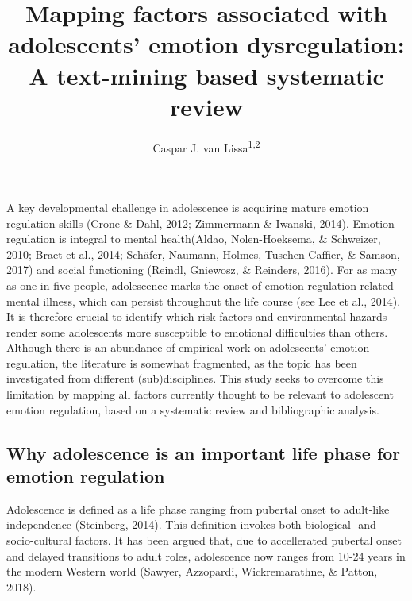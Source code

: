 \documentclass[
  english,
  man]{apa6}
\author{Caspar J. van Lissa\textsuperscript{1,2}}
\affiliation{
\vspace{0.5cm}
\textsuperscript{1} Utrecht University faculty of Social and Behavioral Sciences, department of Methodology \& Statistics\\\textsuperscript{2} Open Science Community Utrecht}
\title{Mapping factors associated with adolescents' emotion dysregulation: A text-mining based systematic review}
\date{}
\begin{document}
\maketitle

A key developmental challenge in adolescence is acquiring mature emotion
regulation skills (Crone \& Dahl, 2012; Zimmermann \& Iwanski, 2014). Emotion regulation is integral to
mental health(Aldao, Nolen-Hoeksema, \& Schweizer, 2010; Braet et al., 2014; Schäfer, Naumann, Holmes, Tuschen-Caffier, \& Samson, 2017)
and social functioning (Reindl, Gniewosz, \& Reinders, 2016). For as many
as one in five people, adolescence marks the onset of emotion
regulation-related mental illness, which can persist throughout the life course
(see Lee et al., 2014). It is therefore crucial to identify which
risk factors and environmental hazards render some adolescents more susceptible
to emotional difficulties than others. Although there is an abundance of
empirical work on adolescents' emotion regulation, the literature is somewhat
fragmented, as the topic has been investigated from different (sub)disciplines.
This study seeks to overcome this limitation by mapping all factors currently
thought to be relevant to adolescent emotion regulation, based on a systematic
review and bibliographic analysis.

\hypertarget{why-adolescence-is-an-important-life-phase-for-emotion-regulation}{%
\subsection{Why adolescence is an important life phase for emotion regulation}\label{why-adolescence-is-an-important-life-phase-for-emotion-regulation}}

Adolescence is defined as a life phase ranging from pubertal onset to
adult-like independence (Steinberg, 2014). This definition
invokes both biological- and socio-cultural factors. It has been argued that,
due to accellerated pubertal onset and delayed transitions to adult roles,
adolescence now ranges from 10-24 years in the modern Western world
(Sawyer, Azzopardi, Wickremarathne, \& Patton, 2018).
\end{document}
